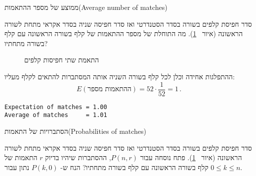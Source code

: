 \begin{prob}{ממוצע של מספר ההתאמות}{}{(Average number of matches)}

סדר חפיסת קלפים בשורה בסדר הסטנדרטי ואז סדר חפיסה שניה בסדר אקראי מתחת לשורה הראשונה (איור%
~\ref{f.cards}).
מה התוחלת של מספר ההתאמות של קלף בשורה הראשונה עם קלף בשורה מתחתיו?
\end{prob}
\begin{figure}[tb]
\begin{center}
\end{center}
\caption{התאמת שתי חפיסות קלפים}\label{f.cards}
\end{figure}

\solution{}

ההתפלגות אחידה וכלן לכל קלף בשורה השניה אותה המסתברות להתאים לקלף מעליו:
\[
E(\textrm{ההתאמות מספר}) = 52\cdot \frac{1}{52} = 1\,.
\]
\begin{verbatim}
Expectation of matches = 1.00
Average of matches     = 1.01
\end{verbatim}


\begin{prob}{הסתברויות של התאמות}{}{(Probabilities of matches)}

סדר חפיסת קלפים בשורה בסדר הסטנדרטי ואז סדר חפיסה שניה בסדר אקראי מתחת לשורה הראשונה (איור%
~\ref{f.cards}).
פתח נוסחה עבור 
$P(n,r)$,
ההסתברות שיהיו בדיוק 
$r$
התאמות של קלף בשורה הראשונה עם קלף בשורה מתחתיו? הנח ש-%
$P(k,0)$
נתון עבור
$0\leq k\leq n$.
\end{prob}

